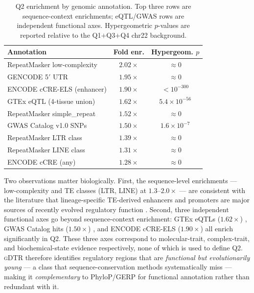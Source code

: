 \documentclass[12pt]{article}
\theoremstyle{plain}
\theoremstyle{definition}
\theoremstyle{remark}
\newcommand{\gDTR}{\textsc{gDTR}}
\begin{document}
\begin{table}[t]
\caption{Q2 enrichment by genomic annotation. Top three rows are
sequence-context enrichments; eQTL/GWAS rows are independent functional
axes. Hypergeometric $p$-values are reported relative to the Q1$+$Q3$+$Q4
chr22 background.}
\label{tab:q2}
\centering
\small
\begin{tabular}{@{}lcc@{}}
\toprule
Annotation & Fold enr. & Hypergeom. $p$ \\
\midrule
RepeatMasker low-complexity   & $2.02\times$ & $\approx 0$ \\
GENCODE 5$'$ UTR              & $1.95\times$ & $\approx 0$ \\
ENCODE cCRE-ELS (enhancer)    & $1.90\times$ & $< 10^{-300}$ \\
GTEx eQTL (4-tissue union)    & $1.62\times$ & $5.4\times 10^{-56}$ \\
RepeatMasker simple\_repeat   & $1.52\times$ & $\approx 0$ \\
GWAS Catalog v1.0 SNPs        & $1.50\times$ & $1.6\times 10^{-7}$ \\
RepeatMasker LTR class        & $1.39\times$ & $\approx 0$ \\
RepeatMasker LINE class       & $1.31\times$ & $\approx 0$ \\
ENCODE cCRE (any)             & $1.28\times$ & $\approx 0$ \\
\bottomrule
\end{tabular}
\end{table}

Two observations matter biologically. First, the sequence-level
enrichments --- low-complexity and TE classes (LTR, LINE) at
$1.3$--$2.0\times$ --- are consistent with the literature that
lineage-specific TE-derived enhancers and promoters are major sources
of recently evolved regulatory function \cite{chuong2017regulatory}.
Second, three independent functional axes go beyond sequence-context
enrichment: GTEx eQTLs ($1.62\times$) \cite{gtex2020}, GWAS Catalog
hits ($1.50\times$) \cite{sollis2023gwas}, and ENCODE cCRE-ELS
($1.90\times$) \cite{moore2020encode} all enrich significantly in Q2.
These three axes correspond to molecular-trait, complex-trait, and
biochemical-state evidence respectively, none of which is used to
define Q2. \gDTR{} therefore identifies regulatory regions that are
\emph{functional but evolutionarily young} --- a class that
sequence-conservation methods systematically miss --- making it
\emph{complementary} to PhyloP/GERP for functional annotation rather
than redundant with it.
\end{document}
